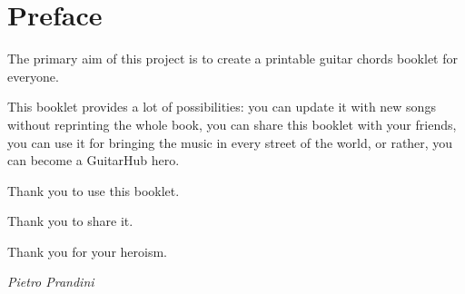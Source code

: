 \section*{Preface}
The primary aim of this project is to create a printable guitar chords booklet for everyone.\par
\medskip
This booklet provides a lot of possibilities: you can update it with new songs without reprinting the whole book,
you can share this booklet with your friends, you can use it for bringing the music in every street of the world, or rather, you can become a GuitarHub hero.\par
\medskip
Thank you to use this booklet.\par
\smallskip
Thank you to share it.\par
\smallskip
Thank you for your heroism.\par
\bigskip
\begin{flushright}
	{\textit{\rmfamily Pietro Prandini}}\par
\end{flushright}
\newpage
